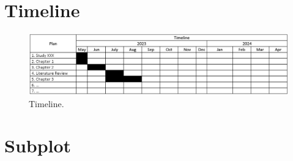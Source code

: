 \documentclass[a4paper]{report} %
\begin{document}
	\section{Timeline}
		\begin{figure}[!h]
			\noindent\Centering
			\includegraphics[width=1\textwidth]{Timeline}
			\caption{Timeline.}
			\label{fig:Project timeline}
		\end{figure}
			
	\section{Subplot}
\end{document}
